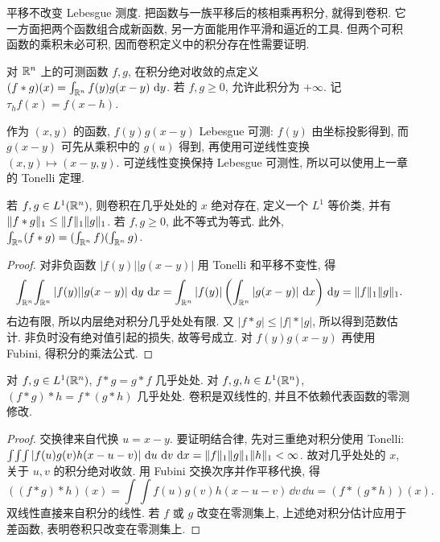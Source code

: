 \label{ra:c7}


平移不改变 Lebesgue 测度. 把函数与一族平移后的核相乘再积分, 就得到卷积. 它一方面把两个函数组合成新函数, 另一方面能用作平滑和逼近的工具. 但两个可积函数的乘积未必可积, 因而卷积定义中的积分存在性需要证明.

\begin{definition}
对 $\mathbb R^n$ 上的可测函数 $f,g$, 在积分绝对收敛的点定义
$(f*g)(x)=\int_{\mathbb R^n}f(y)g(x-y)\,\,\mathrm d y$.
若 $f,g\ge0$, 允许此积分为 $+\infty$. 记 $\tau_hf(x)=f(x-h)$.
\end{definition}

作为 $(x,y)$ 的函数, $f(y)g(x-y)$ Lebesgue 可测: $f(y)$ 由坐标投影得到, 而 $g(x-y)$ 可先从乘积中的 $g(u)$ 得到, 再使用可逆线性变换 $(x,y)\mapsto(x-y,y)$. 可逆线性变换保持 Lebesgue 可测性, 所以可以使用上一章的 Tonelli 定理.

\begin{theorem}[$L^1$ 卷积]\label{ra:c7:l1}
若 $f,g\in L^1(\mathbb R^n)$, 则卷积在几乎处处的 $x$ 绝对存在, 定义一个 $L^1$ 等价类, 并有 $\lVert f*g\rVert_1\le\lVert f\rVert_1\lVert g\rVert_1$. 若 $f,g\ge0$, 此不等式为等式. 此外,
$\int_{\mathbb R^n}(f*g)= (\int_{\mathbb R^n}f)(\int_{\mathbb R^n}g)$.
\end{theorem}
\begin{proof}
对非负函数 $|f(y)||g(x-y)|$ 用 Tonelli 和平移不变性, 得
\[
 \int_{\mathbb R^n}\!\int_{\mathbb R^n}|f(y)||g(x-y)|\,\,\mathrm d y\,\,\mathrm d x
 =\int_{\mathbb R^n}|f(y)|\left(\int_{\mathbb R^n}|g(x-y)|\,\,\mathrm d x\right)\,\mathrm d y
 =\lVert f\rVert_1\lVert g\rVert_1.
\]
右边有限, 所以内层绝对积分几乎处处有限. 又 $|f*g|\le|f|*|g|$, 所以得到范数估计. 非负时没有绝对值引起的损失, 故等号成立. 对 $f(y)g(x-y)$ 再使用 Fubini, 得积分的乘法公式.
\end{proof}

\begin{proposition}[交换律和结合律]\label{ra:c7:algebra}
对 $f,g\in L^1(\mathbb R^n)$, $f*g=g*f$ 几乎处处. 对 $f,g,h\in L^1(\mathbb R^n)$, $(f*g)*h=f*(g*h)$ 几乎处处. 卷积是双线性的, 并且不依赖代表函数的零测修改.
\end{proposition}
\begin{proof}
交换律来自代换 $u=x-y$. 要证明结合律, 先对三重绝对积分使用 Tonelli:
$\int\!\int\!\int|f(u)g(v)h(x-u-v)|\,\,\mathrm d u\,\,\mathrm d v\,\,\mathrm d x
=\lVert f\rVert_1\lVert g\rVert_1\lVert h\rVert_1<\infty$.
故对几乎处处的 $x$, 关于 $u,v$ 的积分绝对收敛. 用 Fubini 交换次序并作平移代换, 得
\[
 ((f*g)*h)(x)
 =\int\!\int f(u)g(v)h(x-u-v)\,\dd v\,\dd u
 =(f*(g*h))(x).
\]
双线性直接来自积分的线性. 若 $f$ 或 $g$ 改变在零测集上, 上述绝对积分估计应用于差函数, 表明卷积只改变在零测集上.
\end{proof}

